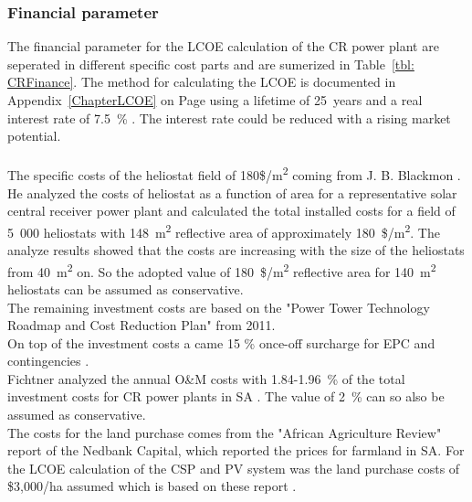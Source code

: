 \documentclass[Master,MEE,english]{twbook}%
\begin{document}
\subsubsection{Financial parameter}
The financial parameter for the LCOE calculation of the CR power plant are seperated in different specific cost parts and are sumerized in Table~\ref{tbl: CRFinance}. The method for calculating the LCOE is documented in Appendix~\ref{ChapterLCOE} on Page \pageref{ChapterLCOE} using a lifetime of 25~years and a real interest rate of 7.5~\% \cite{FraunhoferISE2013}. The interest rate could be reduced with a rising market potential.\\
\\
The specific costs of the heliostat field of 180\$/m\textsuperscript{2} coming from J. B. Blackmon \cite{Blackmon2012}. He analyzed the costs of heliostat as a function of area for a representative solar central receiver power plant and calculated the total installed costs for a field of 5~000 heliostats with 148~m\textsuperscript{2} reflective area of approximately 180~\$/m\textsuperscript{2}. The analyze results showed that the costs are increasing with the size of the heliostats from 40~m\textsuperscript{2} on. So the adopted value of 180~\$/m\textsuperscript{2} reflective area for 140~m\textsuperscript{2} heliostats can be assumed as conservative.\\
The remaining investment costs are based on the "Power Tower Technology Roadmap and Cost Reduction Plan" \cite{Kolb2011} from 2011.\\
On top of the investment costs a came 15 \% once-off surcharge for EPC and contingencies \cite{Platzer2014}.\\
Fichtner analyzed the annual O\&M costs with 1.84-1.96~\% of the total investment costs for CR power plants in SA \cite{Fichtner2010}. The value of 2~\% can so also be assumed as conservative.\\
The costs for the land purchase comes from the "African Agriculture Review" report of the Nedbank Capital, which reported the prices for farmland in SA. For the LCOE calculation of the CSP and PV system was the land purchase costs of \$3,000/ha assumed which is based on these report \cite{Cassell2012}.
\end{document}
